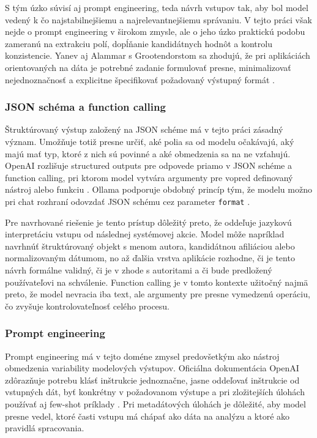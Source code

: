 S tým úzko súvisí aj prompt engineering, teda návrh vstupov tak, aby bol model vedený k čo najstabilnejšiemu a najrelevantnejšiemu správaniu. V tejto práci však nejde o prompt engineering v širokom zmysle, ale o jeho úzko praktickú podobu zameranú na extrakciu polí, dopĺňanie kandidátnych hodnôt a kontrolu konzistencie. Yanev aj Alammar s Grootendorstom sa zhodujú, že pri aplikáciách orientovaných na dáta je potrebné zadanie formulovať presne, minimalizovať nejednoznačnosť a explicitne špecifikovať požadovaný výstupný formát \cite{Yanev2024,AlammarGrootendorst2024}.

\subsubsection{JSON schéma a function calling}

Štruktúrovaný výstup založený na JSON schéme má v tejto práci zásadný význam. Umožňuje totiž presne určiť, aké polia sa od modelu očakávajú, aký majú mať typ, ktoré z nich sú povinné a aké obmedzenia sa na ne vzťahujú. OpenAI rozlišuje structured outputs pre odpovede priamo v JSON schéme a function calling, pri ktorom model vytvára argumenty pre vopred definovaný nástroj alebo funkciu \cite{OpenAIStructuredOutputs,OpenAIFunctionCalling}. Ollama podporuje obdobný princíp tým, že modelu možno pri chat rozhraní odovzdať JSON schému cez parameter \texttt{format} \cite{OllamaStructuredOutputs}.

Pre navrhované riešenie je tento prístup dôležitý preto, že oddeľuje jazykovú interpretáciu vstupu od následnej systémovej akcie. Model môže napríklad navrhnúť štruktúrovaný objekt s menom autora, kandidátnou afiliáciou alebo normalizovaným dátumom, no až ďalšia vrstva aplikácie rozhodne, či je tento návrh formálne validný, či je v zhode s autoritami a či bude predložený používateľovi na schválenie. Function calling je v tomto kontexte užitočný najmä preto, že model nevracia iba text, ale argumenty pre presne vymedzenú operáciu, čo zvyšuje kontrolovateľnosť celého procesu.

\subsubsection{Prompt engineering}

Prompt engineering má v tejto doméne zmysel predovšetkým ako nástroj obmedzenia variability modelových výstupov. Oficiálna dokumentácia OpenAI zdôrazňuje potrebu klásť inštrukcie jednoznačne, jasne oddeľovať inštrukcie od vstupných dát, byť konkrétny v požadovanom výstupe a pri zložitejších úlohách používať aj few-shot príklady \cite{OpenAIPromptGuide}. Pri metadátových úlohách je dôležité, aby model presne vedel, ktoré časti vstupu má chápať ako dáta na analýzu a ktoré ako pravidlá spracovania.

